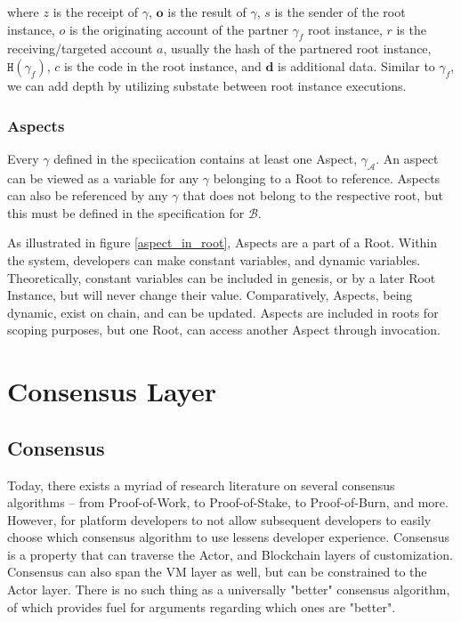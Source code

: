 \documentclass[12pt, titlepage, twocolumn]{report}
\begin{document}
where \(z\) is the receipt of \(\gamma\), \(\mathbf{o}\) is the result of \(\gamma\), \(s\) is the sender of the root instance, \(o\) is the originating account of the partner \(\gamma_f\) root instance, \(r\) is the receiving/targeted account \(a\), usually the hash of the partnered root instance, \(\boldsymbol{\texttt{H}}(\gamma_f)\), \(c\) is the code in the root instance, and \(\mathbf{d}\) is additional data. Similar to \(\gamma_f\), we can add depth by utilizing substate between root instance executions.


\subsection{Aspects}
Every \(\gamma\) defined in the speciication contains at least one Aspect, \(\gamma_{\boldsymbol{\mathcal{A}}}\). An aspect can be viewed as a variable for any \(\gamma\) belonging to a Root to reference. Aspects can also be referenced by any \(\gamma\) that does not belong to the respective root, but this must be defined in the specification for \( \boldsymbol{\mathcal{B}} \). 

As illustrated in figure \ref{aspect_in_root}, Aspects are a part of a Root. Within the system, developers can make constant variables, and dynamic variables. Theoretically, constant variables can be included in genesis, or by a later Root Instance, but will never change their value. Comparatively, Aspects, being dynamic, exist on chain, and can be updated. Aspects are included in roots for scoping purposes, but one Root, can access another Aspect through invocation. 

\chapter{Consensus Layer}


\section{Consensus}
Today, there exists a myriad of research literature on several consensus algorithms -- from Proof-of-Work, to Proof-of-Stake, to Proof-of-Burn, and more. However, for platform developers to not allow subsequent developers to easily choose which consensus algorithm to use lessens developer experience. Consensus is a property that can traverse the Actor, and Blockchain layers of customization. Consensus can also span the VM layer as well, but can be constrained to the Actor layer. There is no such thing as a universally "better" consensus algorithm, of which provides fuel for arguments regarding which ones are "better". 
\end{document}
